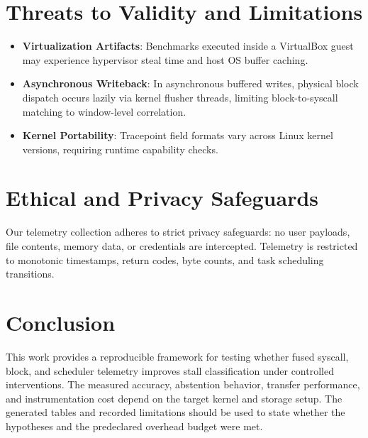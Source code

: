 \documentclass[conference]{IEEEtran}
\begin{document}
\section{Threats to Validity and Limitations}
\begin{itemize}
    \item \textbf{Virtualization Artifacts}: Benchmarks executed inside a VirtualBox guest may experience hypervisor steal time and host OS buffer caching.
    \item \textbf{Asynchronous Writeback}: In asynchronous buffered writes, physical block dispatch occurs lazily via kernel flusher threads, limiting block-to-syscall matching to window-level correlation.
    \item \textbf{Kernel Portability}: Tracepoint field formats vary across Linux kernel versions, requiring runtime capability checks.
\end{itemize}

\section{Ethical and Privacy Safeguards}
Our telemetry collection adheres to strict privacy safeguards: no user payloads, file contents, memory data, or credentials are intercepted. Telemetry is restricted to monotonic timestamps, return codes, byte counts, and task scheduling transitions.

\section{Conclusion}
This work provides a reproducible framework for testing whether fused syscall, block, and scheduler telemetry improves stall classification under controlled interventions. The measured accuracy, abstention behavior, transfer performance, and instrumentation cost depend on the target kernel and storage setup. The generated tables and recorded limitations should be used to state whether the hypotheses and the predeclared overhead budget were met.



\end{document}
